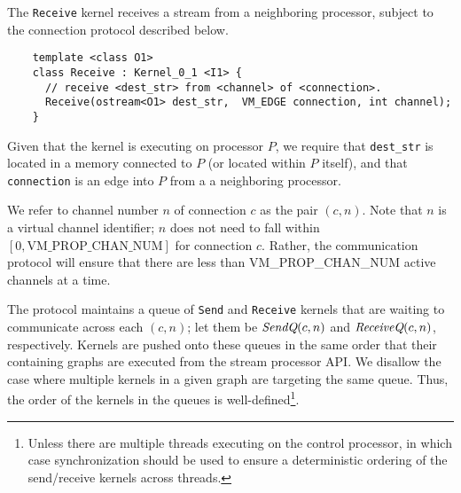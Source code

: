  The {\tt Receive} kernel receives a stream from a
neighboring processor, subject to the connection protocol described
below.  
{\small
\begin{verbatim}
    template <class O1>
    class Receive : Kernel_0_1 <I1> {
      // receive <dest_str> from <channel> of <connection>.
      Receive(ostream<O1> dest_str,  VM_EDGE connection, int channel);
    }  
\end{verbatim}}

Given that the kernel is executing on processor $P$, we require that
{\tt dest\_str} is located in a memory connected to $P$ (or located
within $P$ itself), and that {\tt connection} is an edge into $P$ from
a a neighboring processor.

 We refer to channel number $n$ of
connection $c$ as the pair $(c, n)$.  Note that $n$ is a virtual
channel identifier; $n$ does not need to fall within $[0,
\mbox{VM\_PROP\_CHAN\_NUM}]$ for connection $c$.  Rather, the
communication protocol will ensure that there are less than
VM\_PROP\_CHAN\_NUM active channels at a time.

The protocol maintains a queue of {\tt Send} and {\tt Receive} kernels
that are waiting to communicate across each $(c, n)$; let them be
$\mbox{\it SendQ}(c, n)$ and $\mbox{\it ReceiveQ}(c, n)$, respectively.  Kernels
are pushed onto these queues in the same order that their containing
graphs are executed from the stream processor API.  We disallow the
case where multiple kernels in a given graph are targeting the same
queue.  Thus, the order of the kernels in the queues is
well-defined\footnote{Unless there are multiple threads executing on
the control processor, in which case synchronization should be used to
ensure a deterministic ordering of the send/receive kernels across
threads.}.


